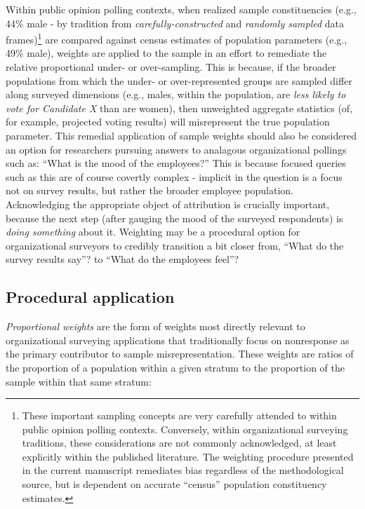 \documentclass[
  man,mask]{apa7}
\begin{document}
Within public opinion polling contexts, when realized sample constituencies (e.g., 44\% male - by tradition from \emph{carefully-constructed} and \emph{randomly sampled} data frames)\footnote{These important sampling concepts are very carefully attended to within public opinion polling contexts. Conversely, within organizational surveying traditions, these considerations are not commonly acknowledged, at least explicitly within the published literature. The weighting procedure presented in the current manuscript remediates bias regardless of the methodological source, but is dependent on accurate ``census'' population constituency estimates.} are compared against census estimates of population parameters (e.g., 49\% male), weights are applied to the sample in an effort to remediate the relative proportional under- or over-sampling. This is because, if the broader populations from which the under- or over-represented groups are sampled differ along surveyed dimensions (e.g., males, within the population, are \emph{less likely to vote for Candidate X} than are women), then unweighted aggregate statistics (of, for example, projected voting results) will misrepresent the true population parameter. This remedial application of sample weights should also be considered an option for researchers pursuing answers to analagous organizational pollings such as: ``What is the mood of the employees?'' This is because focused queries such as this are of course covertly complex - implicit in the question is a focus not on survey results, but rather the broader employee population. Acknowledging the appropriate object of attribution is crucially important, because the next step (after gauging the mood of the surveyed respondents) is \emph{doing something} about it. Weighting may be a procedural option for organizational surveyors to credibly transition a bit closer from, ``What do the survey results say''? to ``What do the employees feel''?

\subsection{Procedural application}\label{procedural-application}

\emph{Proportional weights} are the form of weights most directly relevant to organizational surveying applications that traditionally focus on nonresponse as the primary contributor to sample misrepresentation. These weights are ratios of the proportion of a population within a given stratum to the proportion of the sample within that same stratum:
\end{document}
